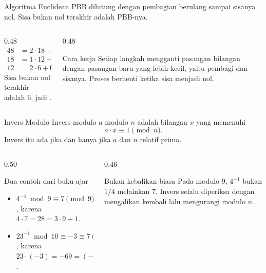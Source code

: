 \documentclass[aspectratio=169,11pt]{beamer}
\begin{document}
\begin{frame}{Algoritma Euclidean}
    PBB dihitung dengan pembagian berulang sampai sisanya nol. Sisa bukan nol
    terakhir adalah PBB-nya.
    \begin{columns}[T,onlytextwidth]
        \begin{column}{0.48\textwidth}
            \[
            \begin{aligned}
                48 &= 2 \cdot 18 + 12\\
                18 &= 1 \cdot 12 + 6\\
                12 &= 2 \cdot 6 + 0
            \end{aligned}
            \]
            Sisa bukan nol terakhir adalah $6$, jadi
            .
        \end{column}
        \begin{column}{0.48\textwidth}
            \begin{block}{Cara kerja}
                Setiap langkah mengganti pasangan bilangan dengan pasangan
                baru yang lebih kecil, yaitu pembagi dan sisanya. Proses
                berhenti ketika sisa menjadi nol.
            \end{block}
        \end{column}
    \end{columns}
\end{frame}

\begin{frame}{Invers Modulo}
    Invers modulo $a$ modulo $n$ adalah bilangan $x$ yang memenuhi
    \[ a \cdot x \equiv 1 \pmod n. \]
    Invers itu ada jika dan hanya jika $a$ dan $n$ relatif prima.
    \vspace{0.1cm}
    \begin{columns}[T,onlytextwidth]
        \begin{column}{0.50\textwidth}
            \begin{exampleblock}{Dua contoh dari buku ajar}
                \begin{itemize}
                    \item $4^{-1} \bmod 9 \equiv 7 \pmod 9$, karena
                          $4 \cdot 7 = 28 = 3 \cdot 9 + 1$.
                    \item $23^{-1} \bmod 10 \equiv -3 \equiv 7 \pmod{10}$,
                          karena $23 \cdot (-3) = -69 = (-7)\cdot 10 + 1$.
                \end{itemize}
            \end{exampleblock}
        \end{column}
        \begin{column}{0.46\textwidth}
            \begin{alertblock}{Bukan kebalikan biasa}
                Pada modulo 9, $4^{-1}$ bukan $1/4$ melainkan $7$. Invers
                selalu diperiksa dengan mengalikan kembali lalu mengurangi
                modulo $n$.
            \end{alertblock}
        \end{column}
    \end{columns}
\end{frame}
\end{document}
